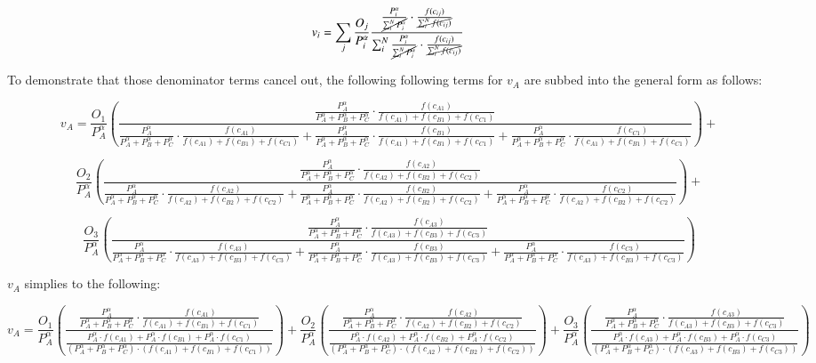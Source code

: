 \documentclass[]{elsarticle} %
\begin{document}
\begin{landscape}
$$
v_{i} = \sum_{j}\frac{O_j}{P_{i }^\alpha}\frac{\frac{P_{i}^\alpha}{\cancel{\sum_{i}^N P_{i}^\alpha}} \cdot \frac{f(c_{ij})}{\cancel{\sum_{i}^N f(c_{ij})}}}{\sum_{i}^N \frac{P_{i}^\alpha}{\cancel{\sum_{i}^N P_{i}^\alpha}} \cdot \frac{f(c_{ij})}{\cancel{\sum_{i}^N f(c_{ij})}}}\
$$

To demonstrate that those denominator terms cancel out, the following following terms for $v_A$ are subbed into the general form as follows:

$$
v_{A} = \frac{O_1}{P_{A}^\alpha}(\frac{\frac{P_{A}^\alpha}{P_{A}^\alpha+P_{B}^\alpha+P_{C}^\alpha} \cdot \frac{f(c_{A1})}{f(c_{A1})+f(c_{B1})+f(c_{C1})}}{\frac{P_{A}^\alpha}{P_{A}^\alpha+P_{B}^\alpha+P_{C}^\alpha} \cdot \frac{f(c_{A1})}{f(c_{A1})+f(c_{B1})+f(c_{C1})} + \frac{P_{A}^\alpha}{P_{A}^\alpha+P_{B}^\alpha+P_{C}^\alpha} \cdot \frac{f(c_{B1})}{f(c_{A1})+f(c_{B1})+f(c_{C1})}+ \frac{P_{A}^\alpha}{P_{A}^\alpha+P_{B}^\alpha+P_{C}^\alpha} \cdot \frac{f(c_{C1})}{f(c_{A1})+f(c_{B1})+f(c_{C1})}}) +
$$

$$
\frac{O_2}{P_{A}^\alpha}(\frac{\frac{P_{A}^\alpha}{P_{A}^\alpha+P_{B}^\alpha+P_{C}^\alpha} \cdot \frac{f(c_{A2})}{f(c_{A2})+f(c_{B2})+f(c_{C2})}}{\frac{P_{A}^\alpha}{P_{A}^\alpha+P_{B}^\alpha+P_{C}^\alpha} \cdot \frac{f(c_{A2})}{f(c_{A2})+f(c_{B2})+f(c_{C2})} + \frac{P_{A}^\alpha}{P_{A}^\alpha+P_{B}^\alpha+P_{C}^\alpha} \cdot \frac{f(c_{B2})}{f(c_{A2})+f(c_{B2})+f(c_{C2})}+\frac{P_{A}^\alpha}{P_{A}^\alpha+P_{B}^\alpha+P_{C}^\alpha} \cdot \frac{f(c_{C2})}{f(c_{A2})+f(c_{B2})+f(c_{C2})}} )+
$$

$$
\frac{O_3}{P_{A}^\alpha}(\frac{\frac{P_{A}^\alpha}{P_{A}^\alpha+P_{B}^\alpha+P_{C}^\alpha} \cdot \frac{f(c_{A3})}{f(c_{A3})+f(c_{B3})+f(c_{C3})}}{\frac{P_{A}^\alpha}{P_{A}^\alpha+P_{B}^\alpha+P_{C}^\alpha} \cdot \frac{f(c_{A3})}{f(c_{A3})+f(c_{B3})+f(c_{C3})} + \frac{P_{A}^\alpha}{P_{A}^\alpha+P_{B}^\alpha+P_{C}^\alpha} \cdot \frac{f(c_{B3})}{f(c_{A3})+f(c_{B3})+f(c_{C3})}+\frac{P_{A}^\alpha}{P_{A}^\alpha+P_{B}^\alpha+P_{C}^\alpha} \cdot \frac{f(c_{C3})}{f(c_{A3})+f(c_{B3})+f(c_{C3})}} )
$$

$v_A$ simplies to the following:

$$
v_{A} = \frac{O_1}{P_{A}^\alpha}(\frac{\frac{P_{A}^\alpha}{P_{A}^\alpha+P_{B}^\alpha+P_{C}^\alpha} \cdot \frac{f(c_{A1})}{f(c_{A1})+f(c_{B1})+f(c_{C1})}}{\frac{P_{A}^\alpha \cdot f(c_{A1}) + P_{A}^\alpha \cdot f(c_{B1}) + P_{A}^\alpha \cdot f(c_{C1})}{(P_{A}^\alpha+P_{B}^\alpha+P_{C}^\alpha) \cdot (f(c_{A1})+f(c_{B1})+f(c_{C1}))}}) +
\frac{O_2}{P_{A}^\alpha}(\frac{\frac{P_{A}^\alpha}{P_{A}^\alpha+P_{B}^\alpha+P_{C}^\alpha} \cdot \frac{f(c_{A2})}{f(c_{A2})+f(c_{B2})+f(c_{C2})}}{\frac{P_{A}^\alpha \cdot f(c_{A2}) + P_{A}^\alpha \cdot f(c_{B2}) + P_{A}^\alpha \cdot f(c_{C2})}{(P_{A}^\alpha+P_{B}^\alpha+P_{C}^\alpha) \cdot (f(c_{A2})+f(c_{B2})+f(c_{C2}))}}) + \frac{O_3}{P_{A}^\alpha}(\frac{\frac{P_{A}^\alpha}{P_{A}^\alpha+P_{B}^\alpha+P_{C}^\alpha} \cdot \frac{f(c_{A3})}{f(c_{A3})+f(c_{B3})+f(c_{C3})}}{\frac{P_{A}^\alpha \cdot f(c_{A3}) + P_{A}^\alpha \cdot f(c_{B3}) + P_{A}^\alpha \cdot f(c_{C3})}{(P_{A}^\alpha+P_{B}^\alpha+P_{C}^\alpha) \cdot (f(c_{A3})+f(c_{B3})+f(c_{C3}))}} )
$$




\end{landscape}
\end{document}

